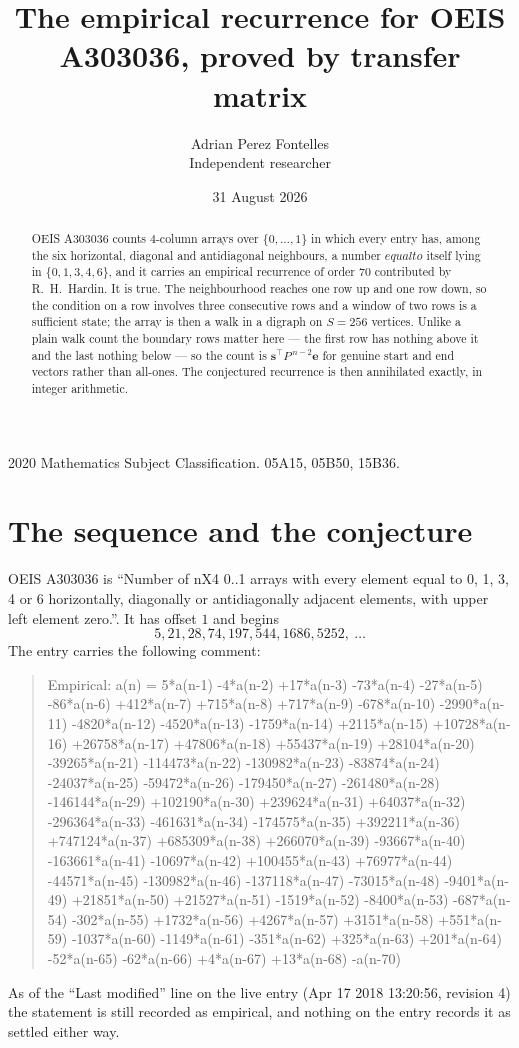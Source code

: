 \documentclass[11pt,a4paper]{article}
\title{The empirical recurrence for OEIS A303036, proved by transfer matrix}
\author{Adrian Perez Fontelles\\ \small Independent researcher}
\date{31 August 2026}
\theoremstyle{plain}
\theoremstyle{definition}
\begin{document}
\maketitle

\begin{abstract}
OEIS A303036 counts $4$-column arrays over $\{0,\dots,1\}$ in which every entry has,
among the six horizontal, diagonal and antidiagonal neighbours, a number $equal to$ itself lying in $\{0,1,3,4,6\}$, and it carries an empirical
recurrence of order $70$ contributed by R.~H.~Hardin. It is true. The neighbourhood
reaches one row up and one row down, so the condition on a row involves three consecutive
rows and a window of two rows is a sufficient state; the array is then a walk in a digraph
on $S=256$ vertices. Unlike a plain walk count the boundary rows matter here --- the first
row has nothing above it and the last nothing below --- so the count is
$\mathbf{s}^{\!\top}P^{\,n-2}\mathbf{e}$ for genuine start and end vectors rather than
all-ones. The conjectured recurrence is then annihilated exactly, in integer arithmetic.
\end{abstract}

\noindent\small 2020 Mathematics Subject Classification. 05A15, 05B50, 15B36.\normalsize

\section{The sequence and the conjecture}

OEIS A303036 is ``Number of nX4 0..1 arrays with every element equal to 0, 1, 3, 4 or 6 horizontally, diagonally or antidiagonally adjacent elements, with upper left element zero.''. It has offset
$1$ and begins
\[
5, 21, 28, 74, 197, 544, 1686, 5252,\ \dots
\]
The entry carries the following comment:
\begin{quote}\small
Empirical: a(n) = 5*a(n-1) -4*a(n-2) +17*a(n-3) -73*a(n-4) -27*a(n-5) -86*a(n-6) +412*a(n-7) +715*a(n-8) +717*a(n-9) -678*a(n-10) -2990*a(n-11) -4820*a(n-12) -4520*a(n-13) -1759*a(n-14) +2115*a(n-15) +10728*a(n-16) +26758*a(n-17) +47806*a(n-18) +55437*a(n-19) +28104*a(n-20) -39265*a(n-21) -114473*a(n-22) -130982*a(n-23) -83874*a(n-24) -24037*a(n-25) -59472*a(n-26) -179450*a(n-27) -261480*a(n-28) -146144*a(n-29) +102190*a(n-30) +239624*a(n-31) +64037*a(n-32) -296364*a(n-33) -461631*a(n-34) -174575*a(n-35) +392211*a(n-36) +747124*a(n-37) +685309*a(n-38) +266070*a(n-39) -93667*a(n-40) -163661*a(n-41) -10697*a(n-42) +100455*a(n-43) +76977*a(n-44) -44571*a(n-45) -130982*a(n-46) -137118*a(n-47) -73015*a(n-48) -9401*a(n-49) +21851*a(n-50) +21527*a(n-51) -1519*a(n-52) -8400*a(n-53) -687*a(n-54) -302*a(n-55) +1732*a(n-56) +4267*a(n-57) +3151*a(n-58) +551*a(n-59) -1037*a(n-60) -1149*a(n-61) -351*a(n-62) +325*a(n-63) +201*a(n-64) -52*a(n-65) -62*a(n-66) +4*a(n-67) +13*a(n-68) -a(n-70)
\end{quote}
As of the ``Last modified'' line on the live entry (Apr 17 2018 13:20:56, revision
4) the statement is still recorded as empirical, and nothing on the entry
records it as settled either way.
\end{document}
